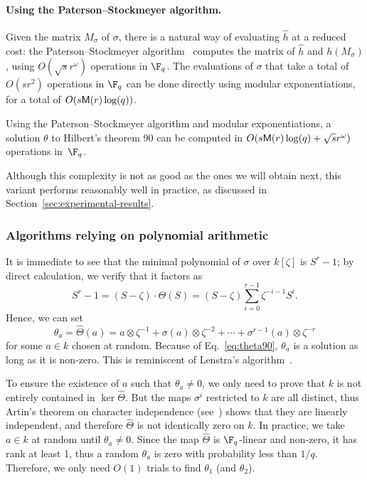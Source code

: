 \paragraph{\bf Using the Paterson--Stockmeyer algorithm.}
Given the matrix $M_\sigma$ of $\sigma$, there is a natural way of evaluating
$\hat{h}$ at a reduced cost: the Paterson--Stockmeyer
algorithm~\cite{paterson_stockmeyer} computes the matrix of $\hat h$
and $h(M_\sigma)$, using $O(\sqrt{s} r^\omega)$ operations in
$\F_q$. The evaluations of $\sigma$ that take a total of $O(s r^2)$
operations in $\F_q$ can be done directly using modular
exponentiations, for a total of $O(s \mathsf{M}(r) \log(q))$.

\begin{proposition}
Using the Paterson--Stockmeyer algorithm and modular exponentiations,
a solution $\theta$ to Hilbert's theorem 90 can be computed in
$O(s \mathsf{M}(r) \log(q) + \sqrt{s} r^\omega)$ operations in~$\F_q$.
\end{proposition}

Although this complexity is not as good as the ones we will obtain
next, this variant performs reasonably well in practice, as discussed
in Section~\ref{sec:experimental-results}.

\subsubsection{Algorithms relying on polynomial arithmetic}
\label{sec:algor-rely-polyn}

It is immediate to see that the minimal polynomial of $\sigma$ over $k[\zeta]$ is
$S^r-1$; by direct calculation, we verify that it
factors as
\begin{equation}
  \label{eq:theta90}
  S^r-1 = (S-\zeta)\cdot\Theta(S) =
  (S-\zeta)\sum_{i=0}^{r-1} \zeta^{-i-1}S^i. 
\end{equation}
Hence, we can set
\begin{equation}
  \label{eq:thetaa}
  \theta_a = \hat\Theta(a)
  =  a\otimes\zeta^{-1} + \sigma(a)\otimes\zeta^{-2} + \cdots + \sigma^{r-1}(a)\otimes\zeta^{-r}
\end{equation}
for some $a\in k$ chosen at random. %
Because of Eq.~\eqref{eq:theta90}, $\theta_a$ is a solution as long as
it is non-zero. %
This is reminiscent of Lenstra's algorithm~\cite[Th.~5.2]{LenstraJr91}.

To ensure the existence of $a$ such that $\theta_a\ne0$, we only need
to prove that $k$ is not entirely contained in $\ker\hat\Theta$. %
But the maps $\sigma^i$ restricted to $k$ are all distinct, thus
Artin's theorem on character independence (see~\cite[Ch~VI, Theorem~4.1]{lang})
shows that they are linearly 
independent, and therefore $\hat\Theta$ is not identically zero on $k$.
In practice, we take $a \in k$ at random until
$\theta_a\ne0$. Since the map $\hat\Theta$ is
$\F_q$-linear and non-zero, it has rank at least 1, thus a
random $\theta_a$ is zero with probability less than $1 / q$. Therefore, we only 
need $O(1)$ trials to find $\theta_1$ (and $\theta_2$).

